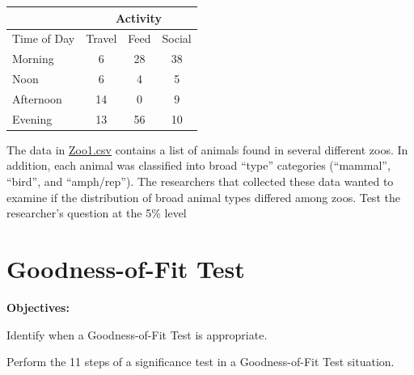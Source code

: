 \documentclass[10pt,openany]{book}\usepackage[]{graphicx}\usepackage[]{color}
\begin{document}
\begin{exsection}
  \begin{center}
    \begin{tabular}{|l|c|c|c|}
      \cline{2-4}
      \multicolumn{1}{l|}{} & \multicolumn{3}{c|}{Activity} \\
      \hline
      Time of Day & Travel & Feed & Social \\
      \hline
      Morning & 6 & 28 & 38 \\
      \hline
      Noon & 6 & 4 & 5 \\
      \hline
      Afternoon & 14 & 0 & 9 \\
      \hline
      Evening & 13 & 56 & 10 \\
      \hline
    \end{tabular}
  \end{center}

  \item \label{revex:chiZoo1} \rhw{} The data in \href{}{Zoo1.csv} contains a list of animals found in several different zoos.  In addition, each animal was classified into broad ``type'' categories (``mammal'', ``bird'', and ``amph/rep'').  The researchers that collected these data wanted to examine if the distribution of broad animal types differed among zoos.  Test the researcher's question at the 5\% level 

\end{exsection}



\chapter[Goodness-of-Fit]{Goodness-of-Fit Test} \label{chap:GOF}

\begin{ChapObj}{\boxwidth}
  \textbf{Objectives:}
  \begin{Enumerate}
    \item Identify when a Goodness-of-Fit Test is appropriate.
    \item Perform the 11 steps of a significance test in a Goodness-of-Fit Test situation.
  \end{Enumerate}
\end{ChapObj}

\vspace{-12pt}
\minitoc
\vspace{12pt}
\end{document}
